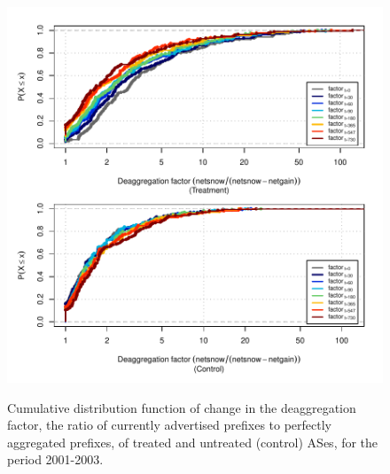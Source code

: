 \clearpage
\vspace*{16pt}
\begin{figure}[H]
\begin{centering}
\begin{singlespace}
\captionsetup{list=no}
    \includegraphics[width=6in]
    {figures/behavior-deagg_factor-2001_2003-corr.pdf}
    \vspace{-2em}\\
    \caption{Cumulative distribution function of change in the deaggregation
    factor, the ratio of currently advertised prefixes to perfectly aggregated
    prefixes, of treated and untreated (control) ASes, for the period
    2001-2003.}
\end{singlespace}
\end{centering}
\end{figure}

